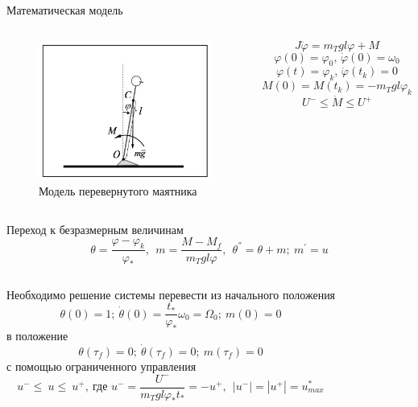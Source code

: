 \documentclass[10pt]{beamer}
\begin{document}
\begin{frame}{Математическая модель}
	\begin{columns}
		\begin{figure}[h!]
			\includegraphics[width=1\linewidth]{images/inverse_pendulum.png}
			\caption{Модель перевернутого маятника}
		\end{figure}

		\[
			J\ddot{\varphi}=m_Tgl\varphi+M
		\]
		\[
			\varphi(0)=\varphi_0,\, \dot{\varphi}(0)=\omega_0
		\]
		\[
			\varphi(t)=\varphi_k,\, \dot{\varphi}(t_k)=0
		\]
		\[
			M(0)=M(t_k)=-m_Tgl\varphi_k
		\]
		\[
			U^-\leq\dot{M}\leq U^+
		\]
	\end{columns}
\end{frame}


\begin{frame}{Переход к безразмерным величинам}
	\[
		\theta=\frac{\varphi-\varphi_k}{\varphi_\ast},\ \ m=\frac{M-M_f}{m_Tgl\varphi}, \ \ \theta^{''}=\theta+m;\ m^{'}=u
	\]
	\begin{columns}
		\column{0.9\textwidth}
		Необходимо решение системы
		перевести из начального положения
		\[
			\theta(0)=1;\ \dot{\theta}(0)=\frac{t_\ast}{\varphi_\ast}\omega_0=\Omega_0;\ m(0)=0
		\]
		в положение
		\[
			\theta(\tau_f)=0;\ \dot{\theta}(\tau_f)=0;\ m(\tau_f)=0
		\]
		с помощью ограниченного управления
		\[
			u^-\le\ u\le\ u^+,\ \text{где } u^-=\frac{U^-}{m_Tgl\varphi_\ast t_\ast}=-u^+, \ \ |u^-|=|u^+|=u_{max}^*
		\]

	\end{columns}
\end{frame}
\end{document}
